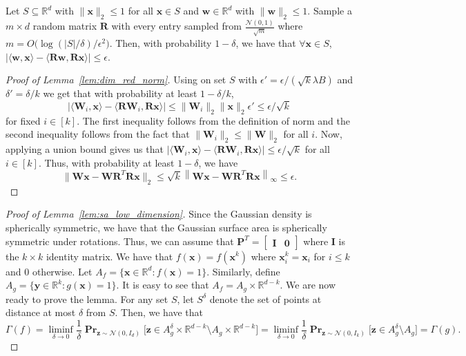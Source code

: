 \documentclass{theoretics}
\newcommand\twonorm[1]{\|#1\|_2}
\newcommand\norm[1]{\left\| #1 \right\|}
\renewcommand\vec[1]{\mathbf{#1}}
\DeclareMathOperator*{\pr}{\mathbf{Pr}}
\newcommand{\R}{\mathbb{R}}
\newcommand{\1}{\Ind}
\newcommand{\x}{\vec x}
\newcommand{\vw}{\vec w}
\newcommand{\z}{\vec z}
\newcommand{\Gauss}{\mathcal{N}}
\begin{document}
\begin{lemma}
\label{thm:ArriagaVempala:99}
    Let $S\subseteq \R^d$ with $\twonorm{\x}\leq 1$ for all $\x\in S$ and $\vw\in \R^{d}$ with $\twonorm{\vw}\leq 1$. Sample a $m\times d$ random matrix $\vec R$ with every entry sampled from $\frac{\Gauss(0,1)}{\sqrt{m}}$  where $m=O\bigl(\log (|S|/\delta)/\epsilon^2\bigr)$. Then, with probability $1-\delta$, we have that $\forall \x\in S$, $|\langle \vw,\x\rangle -\langle \vec R\vw,\vec R\x\rangle|\leq \epsilon$.
\end{lemma}
\begin{proof}[Proof of Lemma~\ref{lem:dim_red_norm}]
\label{proof:lem_dim_red_norm}
    Using  on set $S$ with $\epsilon'=\epsilon/(\sqrt{k}\lambda B)$ and $\delta'=\delta/k$ we get that with probability at least $1-\delta/k$, 
    \[
    |\langle \vec W_i,\x\rangle -\langle \vec R\vec W_i, \vec R\x\rangle|\leq \twonorm{\vec W_i}\twonorm{\x}\epsilon'\leq \epsilon/\sqrt{k}
    \]
    for fixed $i\in [k]$. The first inequality follows from the definition of norm and the second inequality follows from the fact that $\twonorm{\vec W_{i}}\leq \twonorm{\vec W}$ for all $i$. Now, applying a union bound gives us that $|\langle \vec W_i,\x\rangle -\langle \vec R\vec W_i, \vec R\x\rangle|\leq \epsilon/\sqrt{k}$ for all $i\in [k]$. Thus, with probability at least $1-\delta$, we have
    \[
    \twonorm{\vec W \x-\vec W\vec R^T\vec R\x}\leq \sqrt{k}\norm{\vec W \x-\vec W\vec R^T\vec R\x}_{\infty}\leq \epsilon. %
    \]
\end{proof}


\begin{proof}[Proof of Lemma~\ref{lem:sa_low_dimension}]
\label{proof:sa_low_dimension}
Since the Gaussian density is spherically symmetric, we have that the Gaussian surface area is spherically symmetric under rotations. Thus, we can assume that $\vec P^T=\begin{bmatrix}\vec I & \vec 0\end{bmatrix}$ where $\vec I$ is the $k\times k$ identity matrix. We have that $f(\x)=f(\x^k)$ where $\x^k_i=\x_i$ for $i\leq k$ and $0$ otherwise. Let $A_f = \{\x\in\R^d: f(\x)=1\}$. Similarly, define $A_g=\{\vec y\in \R^{k}: g(\x)=1\}$. It is easy to see that $A_f=A_g\times \R^{d-k}$. We are now ready to prove the lemma. For any set $S$, let $S^{\delta}$ denote the set of points at distance at most $\delta$ from $S$. Then, we have that \[\Gamma(f) = \liminf_{\delta \to 0} \frac{1}{\delta} \pr_{\z\sim\Gauss(0,I_d)}\bigr[\z \in A_g^\delta\times \R^{d-k} \setminus A_g\times \R^{d-k}\bigr]=\liminf_{\delta \to 0} \frac{1}{\delta} \pr_{\z\sim\Gauss(0,I_k)}\bigr[\z \in A_g^\delta \setminus A_g\bigr]=\Gamma(g).\]
\end{proof}
\end{document}
